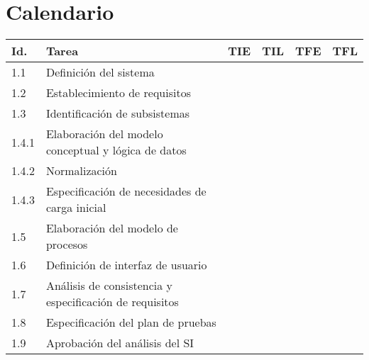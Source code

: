 \documentclass[11pt,a4paper,spanish,twoside]{report}
\begin{document}
\chapter{Calendario}

\begin{table}[!h]
\centering
   \begin{tabular}{|p{0.8cm}||p{5cm}||p{1.5cm}|p{1.5cm}|p{1.5cm}|p{1.5cm}|}
     \hline
     \textbf{Id.} & \textbf{Tarea} & \textbf{TIE} & \textbf{TIL} &
     \textbf{TFE} & \textbf{TFL}\\
     \hline
      1.1 & Definición del sistema  &  &  &  &  \\
      \hline
      1.2 & Establecimiento de requisitos  &  &  &  &  \\
      \hline
      1.3 & Identificación de subsistemas  &  &  &  &  \\
      \hline
      1.4.1 & Elaboración del modelo conceptual y lógica de datos &  &  &  &  \\
      \hline
      1.4.2 & Normalización  &  &  &  &  \\
      \hline
      1.4.3 & Especificación de necesidades de carga inicial  &  &  &  &  \\
      \hline
      1.5 & Elaboración del modelo de procesos  &  &  &  &  \\
      \hline
      1.6 & Definición de interfaz de usuario  &  &  &  &  \\
      \hline
      1.7 & Análisis de consistencia y especificación de requisitos & & & &\\
      \hline
      1.8 & Especificación del plan de pruebas &  &  &  &\\
      \hline
      1.9 & Aprobación del análisis del SI &  &  &  &  \\
      \hline \hline


\end{tabular}
\end{table}
\end{document}

